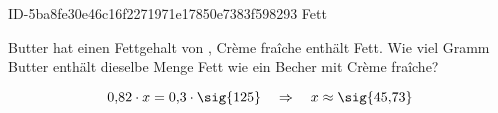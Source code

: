 \begin{exercise}
      {ID-5ba8fe30e46c16f2271971e17850e7383f598293}
      {Fett}
  \ifproblem\problem\par
    Butter hat einen Fettgehalt von , Crème fraîche enthält 
    Fett. Wie viel Gramm Butter enthält dieselbe Menge Fett wie ein Becher
    mit  Crème fraîche?
  \fi
  \ifoutcome\outcome\par
    \begin{equation*}
      0,\!82\cdot x=0,\!3\cdot\text{\sig{125}}
      \quad\Rightarrow\quad
      x\approx\text{\sig{45,73}}
    \end{equation*}
  \fi
\end{exercise}
